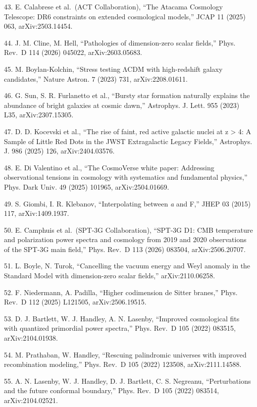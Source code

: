 \documentclass[
]{article}
\begin{document}
43. E. Calabrese et al.~(ACT Collaboration), ``The Atacama Cosmology
Telescope: DR6 constraints on extended cosmological models,'' JCAP 11
(2025) 063, arXiv:2503.14454.

44. J. M. Cline, M. Hell, ``Pathologies of dimension-zero scalar
fields,'' Phys. Rev.~D 114 (2026) 045022, arXiv:2603.05683.

45. M. Boylan-Kolchin, ``Stress testing ΛCDM with high-redshift galaxy
candidates,'' Nature Astron. 7 (2023) 731, arXiv:2208.01611.

46. G. Sun, S. R. Furlanetto et al., ``Bursty star formation naturally
explains the abundance of bright galaxies at cosmic dawn,'' Astrophys.
J. Lett. 955 (2023) L35, arXiv:2307.15305.

47. D. D. Kocevski et al., ``The rise of faint, red active galactic
nuclei at z \textgreater{} 4: A Sample of Little Red Dots in the JWST
Extragalactic Legacy Fields,'' Astrophys. J. 986 (2025) 126,
arXiv:2404.03576.

48. E. Di Valentino et al., ``The CosmoVerse white paper: Addressing
observational tensions in cosmology with systematics and fundamental
physics,'' Phys. Dark Univ. 49 (2025) 101965, arXiv:2504.01669.

49. S. Giombi, I. R. Klebanov, ``Interpolating between \emph{a} and F,''
JHEP 03 (2015) 117, arXiv:1409.1937.

50. E. Camphuis et al.~(SPT-3G Collaboration), ``SPT-3G D1: CMB
temperature and polarization power spectra and cosmology from 2019 and
2020 observations of the SPT-3G main field,'' Phys. Rev.~D 113 (2026)
083504, arXiv:2506.20707.

51. L. Boyle, N. Turok, ``Cancelling the vacuum energy and Weyl anomaly
in the Standard Model with dimension-zero scalar fields,''
arXiv:2110.06258.

52. F. Niedermann, A. Padilla, ``Higher codimension de Sitter branes,''
Phys. Rev.~D 112 (2025) L121505, arXiv:2506.19515.

53. D. J. Bartlett, W. J. Handley, A. N. Lasenby, ``Improved
cosmological fits with quantized primordial power spectra,'' Phys.
Rev.~D 105 (2022) 083515, arXiv:2104.01938.

54. M. Prathaban, W. Handley, ``Rescuing palindromic universes with
improved recombination modeling,'' Phys. Rev.~D 105 (2022) 123508,
arXiv:2111.14588.

55. A. N. Lasenby, W. J. Handley, D. J. Bartlett, C. S. Negreanu,
``Perturbations and the future conformal boundary,'' Phys. Rev.~D 105
(2022) 083514, arXiv:2104.02521.
\end{document}
